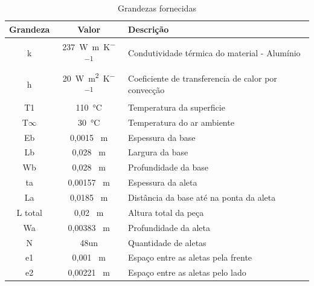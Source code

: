 \vspace{-0.5cm}
\begin{table}[h]
    \ABNTEXfontereduzida
    \centering
    \caption{Grandezas fornecidas}
    \label{tab:grandezasFornecidas}
    \begin{tabular}{c c l}\toprule
        Grandeza    & Valor                                      & Descrição                                           \\
        \toprule
        k           & \SI{237}{\watt\per\meter\per\kelvin}       & Condutividade térmica do material - Alumínio        \\
        h           & \SI{20}{\watt\per\square\meter\per\kelvin} & Coeficiente de transferencia de calor por convecção \\
        T1          & \SI{110}\degreeCelsius                     & Temperatura da superficie                           \\
        T\(\infty\) & \SI{30}\degreeCelsius                      & Temperatura do ar ambiente                          \\
        Eb          & 0,0015 \SI{}{\meter}                       & Espessura da base                                   \\
        Lb          & 0,028 \SI{}{\meter}                        & Largura da base                                     \\
        Wb          & 0,028 \SI{}{\meter}                        & Profundidade da base                                \\
        ta          & 0,00157 \SI{}{\meter}                      & Espessura da aleta                                  \\
        La          & 0,0185 \SI{}{\meter}                       & Distância da base até na ponta da aleta             \\
        L total     & 0,02 \SI{}{\meter}                         & Altura total da peça                                \\
        Wa          & 0,00383 \SI{}{\meter}                      & Profundidade da aleta                               \\
        N           & 48un                                       & Quantidade de aletas                                \\
        e1          & 0,001 \SI{}{\meter}                        & Espaço entre as aletas pela frente                  \\
        e2          & 0,00221 \SI{}{\meter}                      & Espaço entre as aletas pelo lado                    \\
        \bottomrule
    \end{tabular}
    \fonteproprioautor
\end{table}